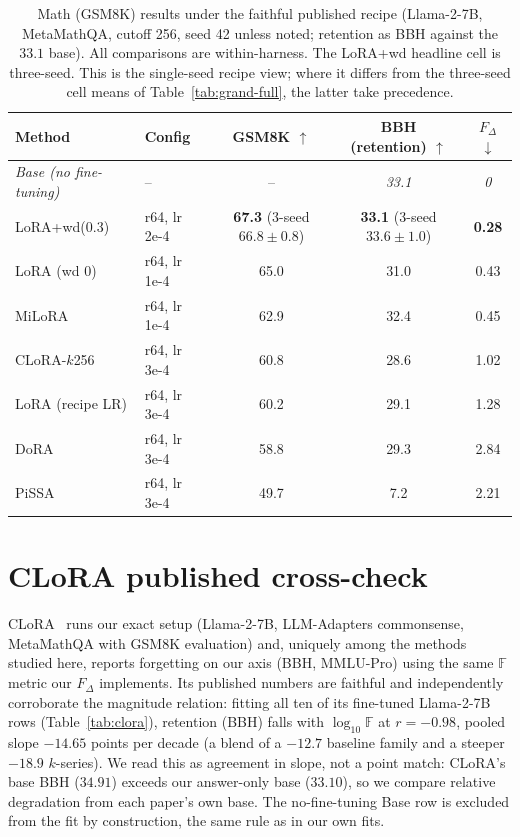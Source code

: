 \documentclass[11pt]{article}
\newcommand{\dw}{F_{\Delta}}
\begin{document}
\begin{table}[t]
  \centering
  \begin{tabular}{l l c c c}
  \toprule
  Method & Config & GSM8K $\uparrow$ & BBH (retention) $\uparrow$ & $\dw$ $\downarrow$ \\
  \midrule
  \textit{Base (no fine-tuning)} & -- & -- & \textit{33.1} & \textit{0} \\
  \midrule
  LoRA+wd(0.3) & r64, lr 2e-4 & \textbf{67.3} {\footnotesize(3-seed $66.8\pm0.8$)} & \textbf{33.1} {\footnotesize(3-seed $33.6\pm1.0$)} & \textbf{0.28} \\
  LoRA (wd 0)  & r64, lr 1e-4 & 65.0 & 31.0 & 0.43 \\
  MiLoRA       & r64, lr 1e-4 & 62.9 & 32.4 & 0.45 \\
  CLoRA-$k$256 & r64, lr 3e-4 & 60.8 & 28.6 & 1.02 \\
  LoRA (recipe LR) & r64, lr 3e-4 & 60.2 & 29.1 & 1.28 \\
  DoRA         & r64, lr 3e-4 & 58.8 & 29.3 & 2.84 \\
  PiSSA        & r64, lr 3e-4 & 49.7 & 7.2  & 2.21 \\
  \bottomrule
  \end{tabular}
  \caption{Math (GSM8K) results under the faithful published recipe
  (Llama-2-7B, MetaMathQA, cutoff 256, seed 42 unless noted; retention as BBH
  against the $33.1$ base). All comparisons are within-harness. The LoRA+wd
  headline cell is three-seed. This is the single-seed recipe view; where it
  differs from the three-seed cell means of Table~\ref{tab:grand-full}, the
  latter take precedence.}
  \label{tab:math}
\end{table}

\section{CLoRA published cross-check}\label{app:clora}
CLoRA~\citep{clora} runs our exact setup (Llama-2-7B, LLM-Adapters
commonsense, MetaMathQA with GSM8K evaluation) and, uniquely among the
methods studied here, reports forgetting on our axis (BBH, MMLU-Pro) using
the same $\mathbb{F}$ metric our $\dw$ implements. Its published numbers are
faithful and independently corroborate the magnitude relation: fitting all
ten of its fine-tuned Llama-2-7B rows (Table~\ref{tab:clora}), retention (BBH)
falls with $\log_{10}\mathbb{F}$ at $r = -0.98$, pooled slope $-14.65$ points
per decade (a blend of a $-12.7$ baseline family and a steeper $-18.9$
$k$-series). We read this as agreement in slope, not a point match: CLoRA's
base BBH ($34.91$) exceeds our answer-only base ($33.10$), so we compare
relative degradation from each paper's own base. The no-fine-tuning Base row
is excluded from the fit by construction, the same rule as in our own fits.
\end{document}
